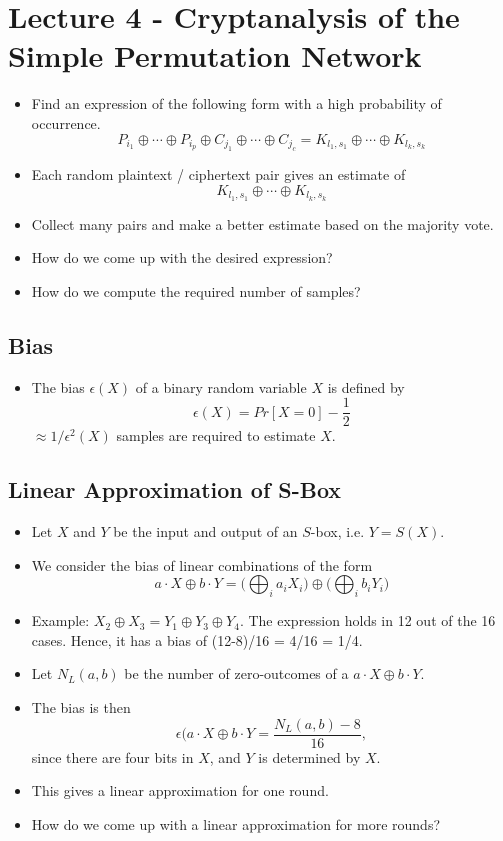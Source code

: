 \documentclass[a4paper]{scrartcl}
\begin{document}
\section*{Lecture 4 - Cryptanalysis of the Simple Permutation Network}

\begin{itemize}
\item Find an expression of the following form with a high probability of occurrence. 
$$P_{i_1} \oplus \cdots \oplus P_{i_p} \oplus C_{j_1} \oplus \cdots \oplus C_{j_c} = K_{l_1, s_1} \oplus \cdots \oplus K_{l_k, s_k}$$
\item Each random plaintext / ciphertext pair gives an estimate of $$K_{l_1, s_1} \oplus \cdots \oplus K_{l_k, s_k}$$
\item Collect many pairs and make a better estimate based on the majority vote.
\item How do we come up with the desired expression?
\item How do we compute the required number of samples?
\end{itemize}
\subsection*{Bias}
\begin{itemize}
\item The bias $\epsilon(X)$ of a binary random variable $X$ is defined by $$\epsilon(X) = Pr [X = 0] - \frac{1}{2}$$
$\approx 1 / \epsilon^2(X)$ samples are required to estimate $X$.
\end{itemize}

\subsection*{Linear Approximation of S-Box}
\begin{itemize}
\item Let $X$ and $Y$ be the input and output of an $S$-box, i.e. {\boldmath$Y = S(X)$}.
\item We consider the bias of linear combinations of the form $$a \cdot X \oplus b \cdot Y = \Bigg(\bigoplus_{i}a_iX_i\Bigg) \oplus \Bigg(\bigoplus_{i}b_iY_i\Bigg)$$
\item Example: $X_2 \oplus X_3 = Y_1 \oplus Y_3 \oplus Y_4$. The expression holds in 12 out of the 16 cases. Hence, it has a bias of (12-8)/16 = 4/16 = 1/4.
\item Let $N_L(a, b)$ be the number of zero-outcomes of a $a \cdot X \oplus b \cdot Y$.
\item The bias is then $$\epsilon(a \cdot X \oplus b \cdot Y = \frac{N_L(a,b) - 8}{16},$$ since there are four bits in $X$, and $Y$ is determined by $X$.
\item This gives a linear approximation for one round.
\item How do we come up with a linear approximation for more rounds?
\end{itemize}
\end{document}
